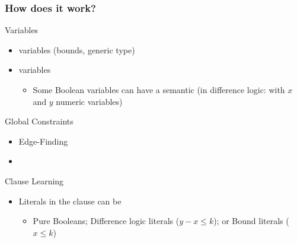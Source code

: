 \begin{frame}
\frametitle{How does it work?}


\begin{myblock}{Variables}
\begin{itemize}
  \item {} variables (bounds, generic type)

  \vfill
  \item {} variables

  \vfill
  \begin{itemize}
     \item Some Boolean variables can have a semantic (in difference logic:  with $x$ and $y$ numeric variables)
   \end{itemize} 
\end{itemize}
\end{myblock}

\begin{myblock}{Global Constraints}
\begin{itemize}
  \item {Edge-Finding} 

  \vfill
  \item {} 
\end{itemize}
\end{myblock}

\begin{myblock}{Clause Learning}
\begin{itemize}
  \item Literals in the clause can be

  \vfill
  \begin{itemize}
    \item Pure Booleans; Difference logic literals ($y - x \leq k$); or Bound literals ($x \leq k$)
  \end{itemize}
\end{itemize}
\end{myblock}

\end{frame}
